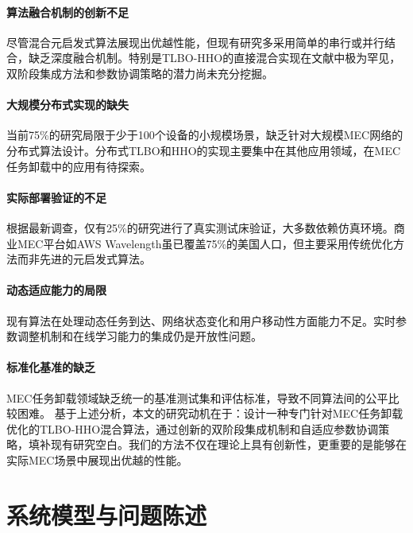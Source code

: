\documentclass[conference]{IEEEtran}
\begin{document}
\paragraph{算法融合机制的创新不足}尽管混合元启发式算法展现出优越性能，但现有研究多采用简单的串行或并行结合，缺乏深度融合机制。特别是TLBO-HHO的直接混合实现在文献中极为罕见，双阶段集成方法和参数协调策略的潜力尚未充分挖掘。
\paragraph{大规模分布式实现的缺失}当前75\%的研究局限于少于100个设备的小规模场景，缺乏针对大规模MEC网络的分布式算法设计。分布式TLBO和HHO的实现主要集中在其他应用领域，在MEC任务卸载中的应用有待探索。
\paragraph{实际部署验证的不足}根据最新调查，仅有25\%的研究进行了真实测试床验证，大多数依赖仿真环境。商业MEC平台如AWS Wavelength虽已覆盖75\%的美国人口，但主要采用传统优化方法而非先进的元启发式算法。
\paragraph{动态适应能力的局限}现有算法在处理动态任务到达、网络状态变化和用户移动性方面能力不足。实时参数调整机制和在线学习能力的集成仍是开放性问题。
\paragraph{标准化基准的缺乏}MEC任务卸载领域缺乏统一的基准测试集和评估标准，导致不同算法间的公平比较困难。
基于上述分析，本文的研究动机在于：设计一种专门针对MEC任务卸载优化的TLBO-HHO混合算法，通过创新的双阶段集成机制和自适应参数协调策略，填补现有研究空白。我们的方法不仅在理论上具有创新性，更重要的是能够在实际MEC场景中展现出优越的性能。

\section{系统模型与问题陈述}
\end{document}

